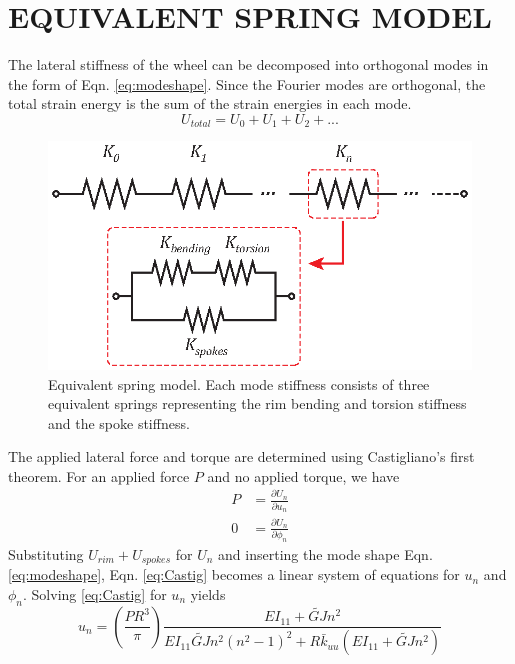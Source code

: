 \documentclass{bmd2016p}
\begin{document}
\section{EQUIVALENT SPRING MODEL}
The lateral stiffness of the wheel can be decomposed into orthogonal modes in the form of Eqn. \ref{eq:modeshape}. Since the Fourier modes are orthogonal, the total strain energy is the sum of the strain energies in each mode.
	\begin{equation}\label{eq:Umode}
	U_{total} = U_0 + U_1 + U_2 + ...
	\end{equation}

\begin{figure}[!ht]
\centering
\includegraphics[scale=1.0]{figures/bmd_figures-03.eps}
\caption{Equivalent spring model. Each mode stiffness consists of three equivalent springs representing the rim bending and torsion stiffness and the spoke stiffness.}
\label{fig:Kn}
\end{figure}

The applied lateral force and torque are determined using Castigliano's first theorem. For an applied force $P$ and no applied torque, we have
	\begin{equation}\label{eq:Castig}
	\begin{split}
	P &= \frac{\partial U_n}{\partial u_n}\\%
	0 &= \frac{\partial U_n}{\partial \phi_n}%
	\end{split}
	\end{equation}
Substituting $U_{rim} + U_{spokes}$ for $U_n$ and inserting the mode shape Eqn. \ref{eq:modeshape}, Eqn. \ref{eq:Castig} becomes a linear system of equations for $u_n$ and $\phi_n$. Solving \ref{eq:Castig} for $u_n$ yields
	\begin{equation}\label{eq:un}
	u_n = \left(\frac{PR^3}{\pi}\right) \frac{EI_{11}+\widetilde{GJ}n^2}{EI_{11}\widetilde{GJ}n^2(n^2-1)^2 + R\bar{k}_{uu}(EI_{11}+\widetilde{GJ}n^2)}
	\end{equation}
\end{document}
